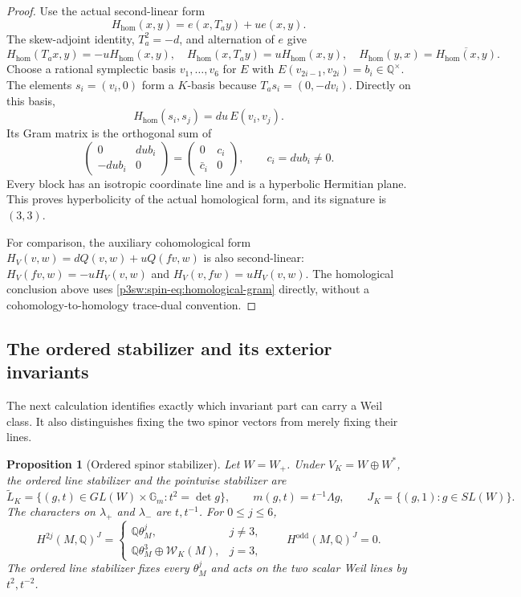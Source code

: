 \documentclass[11pt]{article}
\newcommand{\Q}{\mathbb Q}
\newtheorem{proposition}[theorem]{Proposition}
\numberwithin{equation}{section}
\begin{document}
\begin{proof}
Use the actual second-linear form
\[
 H_{\mathrm{hom}}(x,y)=e(x,T_ay)+u e(x,y).
\]
The skew-adjoint identity, \(T_a^2=-d\), and alternation of \(e\)
give
\[
 H_{\mathrm{hom}}(T_ax,y)=-uH_{\mathrm{hom}}(x,y),\quad
 H_{\mathrm{hom}}(x,T_ay)=uH_{\mathrm{hom}}(x,y),\quad
 H_{\mathrm{hom}}(y,x)=\overline{H_{\mathrm{hom}}(x,y)}.
\]
Choose a rational symplectic basis \(v_1,\ldots,v_6\) for \(E\)
with \(E(v_{2i-1},v_{2i})=b_i\in\Q^\times\).  The elements
\(s_i=(v_i,0)\) form a \(K\)-basis because
\(T_as_i=(0,-dv_i)\).  Directly on this basis,
\begin{equation}
\label{p3sw:spin-eq:homological-gram}
 H_{\mathrm{hom}}(s_i,s_j)=du\,E(v_i,v_j).
\end{equation}
Its Gram matrix is the orthogonal sum of
\[
 \begin{pmatrix}0&du b_i\\-du b_i&0\end{pmatrix}
     =\begin{pmatrix}0&c_i\\\bar c_i&0\end{pmatrix},
 \qquad c_i=du b_i\ne0.
\]
Every block has an isotropic coordinate line and is a hyperbolic
Hermitian plane.  This proves hyperbolicity of the actual homological
form, and its signature is \((3,3)\).

For comparison, the auxiliary cohomological form
\(H_V(v,w)=dQ(v,w)+uQ(fv,w)\) is also second-linear:
\(H_V(fv,w)=-uH_V(v,w)\) and \(H_V(v,fw)=uH_V(v,w)\).
The homological conclusion above uses
\eqref{p3sw:spin-eq:homological-gram} directly, without a
cohomology-to-homology trace-dual convention.
\end{proof}

\subsection{The ordered stabilizer and its exterior invariants}

The next calculation identifies exactly which invariant part can
carry a Weil class.  It also distinguishes fixing the two spinor
vectors from merely fixing their lines.

\begin{proposition}[Ordered spinor stabilizer]
\label{p3sw:ordered-stabilizer}
Let \(W=W_+\).  Under \(V_K=W\oplus W^*\), the ordered line
stabilizer and the pointwise stabilizer are
\[
 \widetilde L_K
   =\{(g,t)\in GL(W)\times\mathbb G_m:t^2=\det g\},\qquad
 m(g,t)=t^{-1}\Lambda g,\qquad
 J_K=\{(g,1):g\in SL(W)\}.
\]
The characters on \(\lambda_+\) and \(\lambda_-\) are \(t,t^{-1}\).
For \(0\leq j\leq6\),
\begin{equation}
\label{p3sw:spin-eq:invariants}
 H^{2j}(M,\Q)^J=
 \begin{cases}
  \Q\theta_M^j,&j\ne3,\\
  \Q\theta_M^3\oplus\mathcal W_K(M),&j=3,
 \end{cases}
 \qquad H^{\mathrm{odd}}(M,\Q)^J=0 .
\end{equation}
The ordered line stabilizer fixes every \(\theta_M^j\) and acts on
the two scalar Weil lines by \(t^2,t^{-2}\).
\end{proposition}
\end{document}
